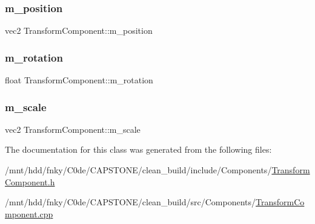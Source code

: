 \subsubsection{\texorpdfstring{m\+\_\+position}{m\_position}}
{\footnotesize\ttfamily vec2 Transform\+Component\+::m\+\_\+position\hspace{0.3cm}{\ttfamily [private]}}

\mbox{\label{classTransformComponent_ae34e99299bb74a9e8674eab1a898095f}} 
\subsubsection{\texorpdfstring{m\+\_\+rotation}{m\_rotation}}
{\footnotesize\ttfamily float Transform\+Component\+::m\+\_\+rotation\hspace{0.3cm}{\ttfamily [private]}}

\mbox{\label{classTransformComponent_a206ad4f98e73d416584d6431a36b3c77}} 
\subsubsection{\texorpdfstring{m\+\_\+scale}{m\_scale}}
{\footnotesize\ttfamily vec2 Transform\+Component\+::m\+\_\+scale\hspace{0.3cm}{\ttfamily [private]}}



The documentation for this class was generated from the following files\+:\begin{DoxyCompactItemize}
\item 
/mnt/hdd/fnky/\+C0de/\+C\+A\+P\+S\+T\+O\+N\+E/clean\+\_\+build/include/\+Components/\hyperlink{TransformComponent_8h}{Transform\+Component.\+h}\item 
/mnt/hdd/fnky/\+C0de/\+C\+A\+P\+S\+T\+O\+N\+E/clean\+\_\+build/src/\+Components/\hyperlink{TransformComponent_8cpp}{Transform\+Component.\+cpp}\end{DoxyCompactItemize}

